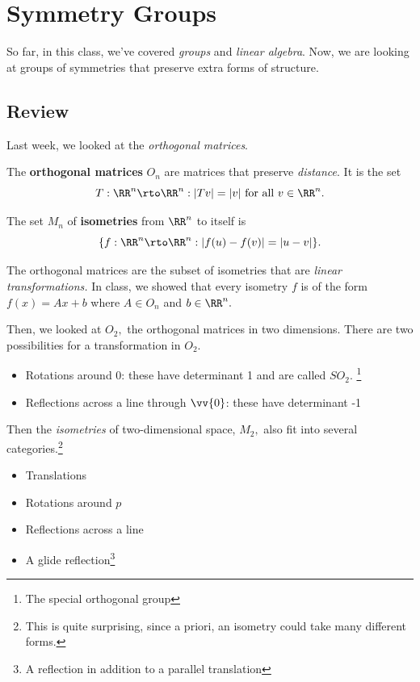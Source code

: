 \newpage


\section{Symmetry Groups}

So far, in this class, we've covered \emph{groups} and \emph{linear algebra}. Now, we are looking at groups of symmetries that preserve extra forms of structure. 

\subsection{Review}
Last week, we looked at the \emph{orthogonal matrices}. 
 
\begin{definition}
The \textbf{orthogonal matrices} $O_n$ are matrices that preserve \emph{distance}. It is the set 
\[
T: \RR^n \rto \RR^n : |Tv| = |v| \text{ for all } v \in \RR^n.
\]
\end{definition}

\begin{definition}
The set $M_n$ of \textbf{isometries} from $\RR^n$ to itself is 
\[
\{f: \RR^n \rto \RR^n : |f(u)-f(v)| = |u-v|\}.
\]
\end{definition}

The orthogonal matrices are the subset of isometries that are \emph{linear transformations.} In class, we showed that every isometry $f$ is of the form $f(x) = Ax + b$ where $A \in O_n$ and $b \in \RR^n.$

Then, we looked at $O_2,$ the orthogonal matrices in two dimensions. There are two possibilities for a transformation in $O_2.$
\begin{itemize}
    \item Rotations around $0$: these have determinant 1 and are called $SO_2$. \footnote{The special orthogonal group}
    \item Reflections across a line through $\vv{0}$: these have determinant -1
\end{itemize}

Then the \emph{isometries} of two-dimensional space, $M_2,$ also fit into several categories.\footnote{This is quite surprising, since a priori, an isometry could take many different forms.}
\begin{itemize}
    \item Translations
    \item Rotations around $p$ 
    \item Reflections across a line
    \item A glide reflection\footnote{A reflection in addition to a parallel translation}
\end{itemize}

